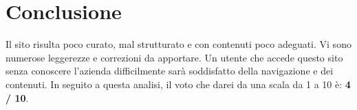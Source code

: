 \section{Conclusione}
Il sito risulta poco curato, mal strutturato e con contenuti poco adeguati. Vi sono numerose leggerezze e correzioni da apportare. Un utente che accede questo sito senza conoscere l'azienda difficilmente sarà soddisfatto della navigazione e dei contenuti. In seguito a questa analisi, il voto che darei da una scala da 1 a 10 è: \textbf{4 / 10}.